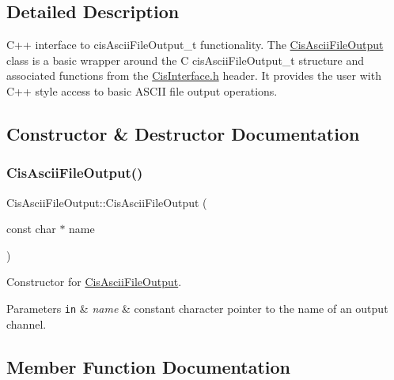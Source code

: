 \subsection{Detailed Description}
C++ interface to cis\+Ascii\+File\+Output\+\_\+t functionality. The \mbox{\hyperlink{classCisAsciiFileOutput}{Cis\+Ascii\+File\+Output}} class is a basic wrapper around the C cis\+Ascii\+File\+Output\+\_\+t structure and associated functions from the \mbox{\hyperlink{CisInterface_8h_source}{Cis\+Interface.\+h}} header. It provides the user with C++ style access to basic A\+S\+C\+II file output operations. 

\subsection{Constructor \& Destructor Documentation}
\mbox{\label{classCisAsciiFileOutput_ab17524610ace98b485e02932ba3468af}} 
\subsubsection{\texorpdfstring{Cis\+Ascii\+File\+Output()}{CisAsciiFileOutput()}}
{\footnotesize\ttfamily Cis\+Ascii\+File\+Output\+::\+Cis\+Ascii\+File\+Output (\begin{DoxyParamCaption}\item[{const char $\ast$}]{name }\end{DoxyParamCaption})\hspace{0.3cm}{\ttfamily [inline]}}



Constructor for \mbox{\hyperlink{classCisAsciiFileOutput}{Cis\+Ascii\+File\+Output}}. 


\begin{DoxyParams}[1]{Parameters}
\mbox{\tt in}  & {\em name} & constant character pointer to the name of an output channel. \\
\hline
\end{DoxyParams}


\subsection{Member Function Documentation}
\mbox{\label{classCisAsciiFileOutput_a8863d020f0cc7c4690fa0877358eae6d}} 
